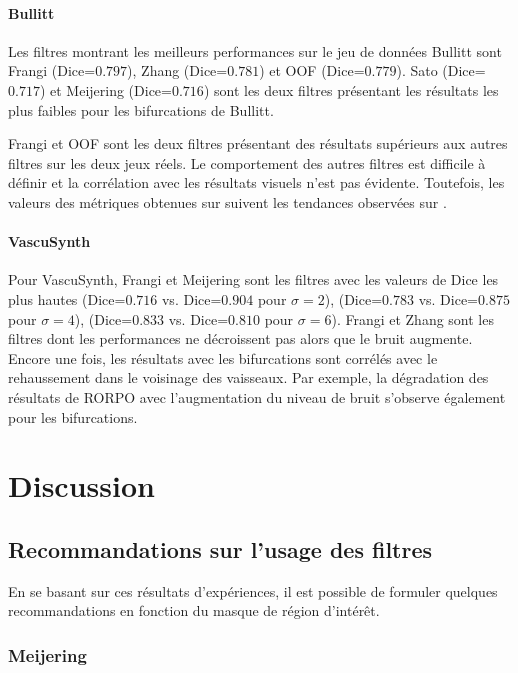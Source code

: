 \paragraph{Bullitt}

Les filtres montrant les meilleurs performances sur le jeu de données Bullitt sont Frangi (Dice=$0.797$), Zhang (Dice=$0.781$) et OOF (Dice=$0.779$). Sato (Dice=$0.717$) et Meijering (Dice=$0.716$) sont les deux filtres présentant les résultats les plus faibles pour les bifurcations de Bullitt. 

Frangi et OOF sont les deux filtres présentant des résultats supérieurs aux autres filtres sur les deux jeux réels. Le comportement des autres filtres est difficile à définir et la corrélation avec les résultats visuels n'est pas évidente. Toutefois, les valeurs des métriques obtenues sur \maskbif suivent les tendances observées sur \maskvascular.

\paragraph{VascuSynth}

Pour VascuSynth, Frangi et Meijering sont les filtres avec les valeurs de Dice les plus hautes (Dice=$0.716$ vs. Dice=$0.904$ pour $\sigma=2$), (Dice=$0.783$ vs. Dice=$0.875$ pour $\sigma=4$), (Dice=$0.833$ vs. Dice=$0.810$ pour $\sigma=6$). Frangi et Zhang sont les filtres dont les performances ne décroissent pas alors que le bruit augmente.
Encore une fois, les résultats avec les bifurcations sont corrélés avec le rehaussement dans le voisinage des vaisseaux. Par exemple, la dégradation des résultats de RORPO avec l'augmentation du niveau de bruit s'observe également pour les bifurcations.

\section{Discussion}

\subsection{Recommandations sur l'usage des filtres}

En se basant sur ces résultats d'expériences, il est possible de formuler quelques recommandations en fonction du masque de région d'intérêt.

\subsubsection*{Meijering}

